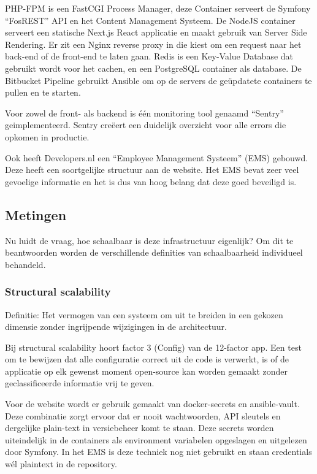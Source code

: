 PHP-FPM is een FastCGI Process Manager, deze Container serveert de Symfony “FosREST” API en het Content Management Systeem. De NodeJS container serveert een statische Next.js React applicatie en maakt gebruik van Server Side Rendering. Er zit een Nginx reverse proxy in die kiest om een request naar het back-end of de front-end te laten gaan. Redis is een Key-Value Database dat gebruikt wordt voor het cachen, en een PostgreSQL container als database. De Bitbucket Pipeline gebruikt Ansible om op de servers de geüpdatete containers te pullen en te starten.

Voor zowel de front- als backend is één monitoring tool genaamd \enquote{Sentry} geimplementeerd. Sentry creëert een duidelijk overzicht voor alle errors die opkomen in productie.

Ook heeft Developers.nl een \enquote{Employee Management Systeem} (EMS) gebouwd. Deze heeft een soortgelijke structuur aan de website. Het EMS bevat zeer veel gevoelige informatie en het is dus van hoog belang dat deze goed beveiligd is.

\subsection{Metingen}

Nu luidt de vraag, hoe schaalbaar is deze infrastructuur eigenlijk? Om dit te beantwoorden worden de verschillende definities van schaalbaarheid individueel behandeld. 

\subsubsection{Structural scalability}
Definitie: Het vermogen van een systeem om uit te breiden in een gekozen dimensie zonder ingrijpende wijzigingen in de architectuur.

Bij structural scalability hoort factor 3 (Config) van de 12-factor app. Een test om te bewijzen dat alle configuratie correct uit de code is verwerkt, is of de applicatie op elk gewenst moment open-source kan worden gemaakt zonder geclassificeerde informatie vrij te geven.

Voor de website wordt er gebruik gemaakt van docker-secrets en ansible-vault. Deze combinatie zorgt ervoor dat er nooit wachtwoorden, API sleutels en dergelijke plain-text in versiebeheer komt te staan. Deze secrets worden uiteindelijk in de containers als environment variabelen opgeslagen en uitgelezen door Symfony. In het EMS is deze techniek nog niet gebruikt en staan credentials wél plaintext in de repository.

